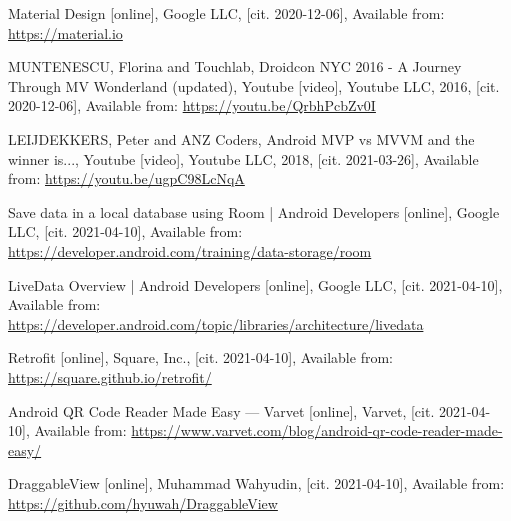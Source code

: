 \begin{thebibliography}{9}

 Material Design [online], Google LLC, [cit. 2020-12-06], Available from: \url{https://material.io}

 MUNTENESCU, Florina and Touchlab, Droidcon NYC 2016 - A Journey Through MV Wonderland (updated), Youtube [video], Youtube LLC, 2016, [cit. 2020-12-06], Available from: \url{https://youtu.be/QrbhPcbZv0I}

 LEIJDEKKERS, Peter and ANZ Coders, Android MVP vs MVVM and the winner is..., Youtube [video], Youtube LLC, 2018, [cit. 2021-03-26], Available from: \url{https://youtu.be/ugpC98LcNqA}

 Save data in a local database using Room | Android Developers [online], Google LLC, [cit. 2021-04-10], Available from: \url{https://developer.android.com/training/data-storage/room}

 LiveData Overview | Android Developers [online], Google LLC, [cit. 2021-04-10], Available from: \url{https://developer.android.com/topic/libraries/architecture/livedata}

 Retrofit [online], Square, Inc., [cit. 2021-04-10], Available from: \url{https://square.github.io/retrofit/}

 Android QR Code Reader Made Easy — Varvet [online], Varvet, [cit. 2021-04-10], Available from: \url{https://www.varvet.com/blog/android-qr-code-reader-made-easy/}

 DraggableView [online], Muhammad Wahyudin, [cit. 2021-04-10], Available from: \url{https://github.com/hyuwah/DraggableView}

\end{thebibliography}